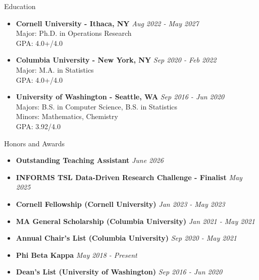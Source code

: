 \documentclass{resume} %
\begin{document}

\begin{rSection}{Education}
\begin{itemize}
\item {\bf Cornell University - Ithaca, NY} \hfill {\em Aug 2022 - May 2027}\\
Major: Ph.D. in Operations Research\\
GPA: 4.0+/4.0
\item {\bf Columbia University - New York, NY} \hfill {\em Sep 2020 - Feb 2022}\\
Major: M.A. in Statistics\\
GPA: 4.0+/4.0
\item {\bf University of Washington - Seattle, WA} \hfill {\em Sep 2016 - Jun 2020}\\
Majors: B.S. in Computer Science, B.S. in Statistics\\
Minors: Mathematics, Chemistry\\
GPA: 3.92/4.0
\end{itemize}
\end{rSection}

\begin{rSection}{Honors and Awards}
\begin{itemize}
\item {\bf Outstanding Teaching Assistant} \hfill {\em June 2026}
\item {\bf INFORMS TSL Data-Driven Research Challenge - Finalist} \hfill {\em May 2025}
\item {\bf Cornell Fellowship (Cornell University)} \hfill {\em Jan 2023 - May 2023}
\item {\bf MA General Scholarship (Columbia University)} \hfill {\em Jan 2021 - May 2021}
\item {\bf Annual Chair's List (Columbia University)} \hfill {\em Sep 2020 - May 2021}
\item {\bf Phi Beta Kappa} \hfill {\em May 2018 - Present}
\item {\bf Dean's List (University of Washington)} \hfill {\em Sep 2016 - Jun 2020}
\end{itemize}
\end{rSection}
\end{document}
